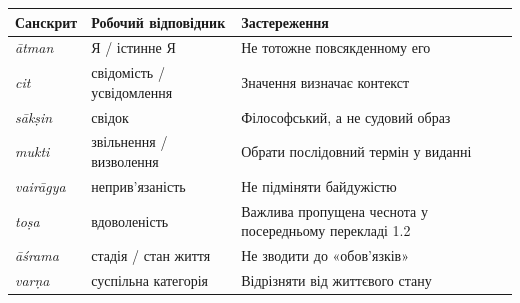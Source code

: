 \begin{longtable}{@{}p{}p{}p{}@{}}
\textbf{\sffamily Санскрит} & \textbf{\sffamily Робочий відповідник} & \textbf{\sffamily Застереження} \\
\hline
\endhead
\textit{ātman} & Я / істинне Я & Не тотожне повсякденному его \\
\textit{cit} & свідомість / усвідомлення & Значення визначає контекст \\
\textit{sākṣin} & свідок & Філософський, а не судовий образ \\
\textit{mukti} & звільнення / визволення & Обрати послідовний термін у виданні \\
\textit{vairāgya} & неприв'язаність & Не підміняти байдужістю \\
\textit{toṣa} & вдоволеність & Важлива пропущена чеснота у посередньому перекладі 1.2 \\
\textit{āśrama} & стадія / стан життя & Не зводити до «обов'язків» \\
\textit{varṇa} & суспільна категорія & Відрізняти від життєвого стану \\
\end{longtable}
